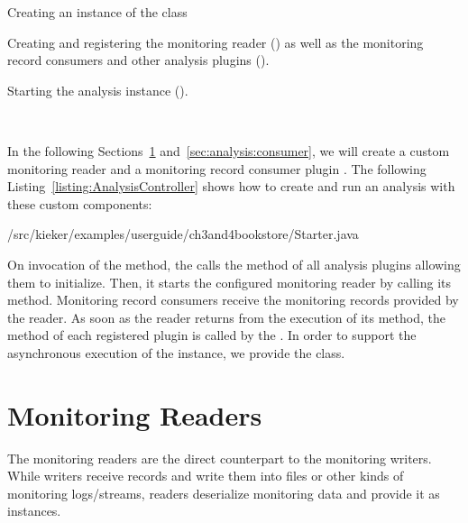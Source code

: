 \enlargethispage{1cm}

\begin{compactenum}
\item Creating an instance of the  class
\item Creating and registering the monitoring reader () as %
well as the monitoring record consumers and other analysis plugins ().
\item Starting the analysis instance ().
\end{compactenum}

\

\noindent In the following Sections~\ref{sec:analysis:reader} and~\ref{sec:analysis:consumer}, %
we will create a custom monitoring reader  and a %
monitoring record consumer plugin . %
\noindent The following Listing~\ref{listing:AnalysisController} shows how to create and run an analysis %
with these custom components:

\setJavaCodeListing
%
{\customComponentsBookstoreApplicationDir/src/kieker/examples/userguide/ch3and4bookstore/Starter.java}

\enlargethispage{1.2cm}

\noindent On invocation of the  method, the  %
calls the  method of all analysis plugins allowing them to initialize. %
Then, it starts the configured monitoring reader by calling its  %
method. Monitoring record consumers receive the monitoring records provided by %
the reader. As soon as the reader returns from the execution of its  
method, the method  of each registered plugin is called by the %
. %
In order to support the asynchronous execution of the  instance, %
we provide the  class.

\section{Monitoring Readers}\label{sec:analysis:reader}

The monitoring readers are the direct counterpart to the monitoring %
writers. While writers receive records and write them into files or other kinds %
of monitoring logs/streams, readers deserialize monitoring data and provide it as %
 instances. 

